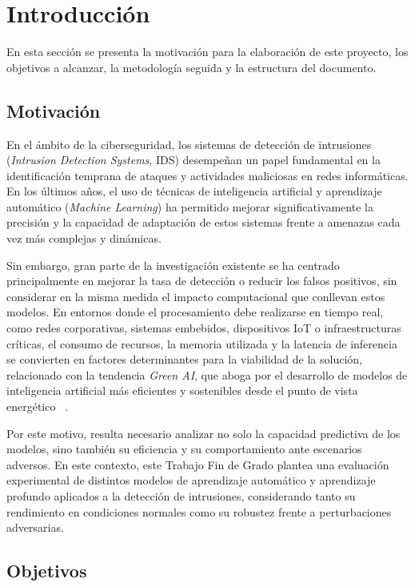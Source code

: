 \chapter{Introducción}
 
En esta sección se presenta la motivación para la elaboración de este proyecto, los objetivos a alcanzar, la metodología seguida y la estructura del documento.

\section{Motivación}

En el ámbito de la ciberseguridad, los sistemas de detección de intrusiones (\textit{Intrusion Detection Systems}, IDS) desempeñan un papel fundamental 
en la identificación temprana de ataques y actividades maliciosas en redes informáticas. En los últimos años, el uso de técnicas de inteligencia artificial 
y aprendizaje automático (\textit{Machine Learning}) ha permitido mejorar significativamente la precisión y la capacidad de adaptación de estos sistemas 
frente a amenazas cada vez más complejas y dinámicas. 

Sin embargo, gran parte de la investigación existente se ha centrado principalmente en mejorar la tasa de detección o reducir 
los falsos positivos, sin considerar en la misma medida el impacto computacional que conllevan estos modelos. En entornos 
donde el procesamiento debe realizarse en tiempo real, como redes corporativas, sistemas embebidos, dispositivos IoT o 
infraestructuras críticas, el consumo de recursos, la memoria utilizada y la latencia de inferencia se convierten en factores 
determinantes para la viabilidad de la solución, relacionado con la tendencia \textit{Green AI}, que aboga por el desarrollo de modelos de inteligencia artificial más eficientes y sostenibles desde el punto de vista energético ~\cite{green_ai}.

Por este motivo, resulta necesario analizar no solo la capacidad predictiva de los modelos, sino también su eficiencia y su comportamiento ante escenarios adversos. 
En este contexto, este Trabajo Fin de Grado plantea una evaluación experimental de distintos modelos de aprendizaje automático y aprendizaje profundo aplicados a la detección de intrusiones, considerando tanto su rendimiento en condiciones normales como su robustez frente a perturbaciones adversarias.

\section{Objetivos}

